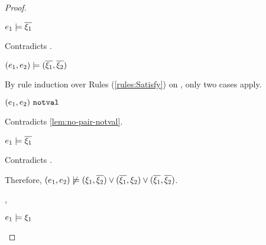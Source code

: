 \begin{proof}
\begin{byCases}
\begin{byCases}
\begin{byCases}
\begin{byCases}
\begin{byCases}
\begin{byCases}
\begin{pfsteps*}
                        \item $e_1 \models \overline{\xi_1}$ 
                        \end{pfsteps*}
                        Contradicts .
                    \end{byCases}
                \item[\text{(\ref{rule:CSOr2})}]
                    \begin{pfsteps*}
                    \item $(e_1 , e_2) \models (\overline{\xi_1} , \overline{\xi_2})$  
                    \end{pfsteps*}
                    By rule induction over Rules (\ref{rules:Satisfy}) on , only two cases apply.
                   \begin{byCases}
                    \item[\text{(\ref{rule:CSNotValPair})}]
                        \begin{pfsteps*}
                        \item $(e_1 , e_2) ~\mathtt{notval}$ 
                        \end{pfsteps*}
                        Contradicts \autoref{lem:no-pair-notval}.
                    \item[\text{(\ref{rule:CSPair})}]
                        \begin{pfsteps*}
                        \item $e_1 \models \overline{\xi_1}$ 
                        \end{pfsteps*}
                        Contradicts .
                    \end{byCases}
                \end{byCases}
            \end{byCases}
            Therefore, $(e_1 , e_2) \not\models (\xi_1 , \overline{\xi_2}) \vee (\overline{\xi_1} , \xi_2) \vee (\overline{\xi_1} , \overline{\xi_2})$.
        \item[\csatisfy{e_1}{\xi_1},\csatisfy{e_2}{\cdual{\xi_2}}]
            \begin{pfsteps*}
            \item $e_1 \models \xi_1$  

\end{pfsteps*}
\end{byCases}
\end{byCases}
\end{byCases}
\end{proof}
